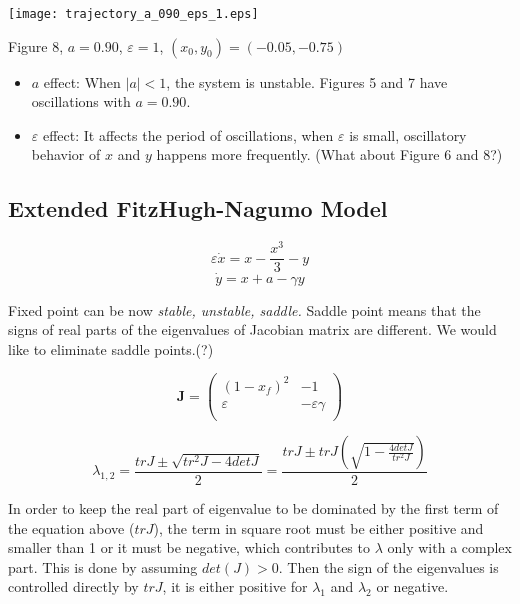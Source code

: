 \documentclass{article}
\begin{document}
\begin{center}
\texttt{[image: trajectory\_a\_090\_eps\_1.eps]}
\begin{footnotesize}
 Figure 8, $a=0.90$, $\varepsilon=1$, $(x_0,y_0)=(-0.05,-0.75)$
\end{footnotesize}
\end{center}
\begin{itemize}

 \item $a$ effect: When $|a|<1$, the system is unstable. Figures 5 and 7 have oscillations with $a=0.90$. 

 \item $\varepsilon$ effect: It affects the period of oscillations, when $\varepsilon$ is small, oscillatory behavior of $x$ and $y$ happens more frequently. (What about Figure 6 and 8?)
\end{itemize}

\subsection{Extended FitzHugh-Nagumo Model}

\begin{equation}
 \varepsilon \dot{x} = x- \frac{x^3}{3}-y 
\end{equation}
\begin{equation}
 \dot{y}=x+a -\gamma y
\end{equation}

Fixed point can be now \textit{stable, unstable, saddle.} \newline
Saddle point means that the signs of real parts of the eigenvalues of Jacobian matrix are different. We would like to eliminate saddle points.(?)

\[
\textbf{J}=
\left( {\begin{array}{cc }
(1-x_f)^2  &  -1  \\
\varepsilon &  -\varepsilon\gamma  \\

\end{array} } \right)
\]

\begin{equation*}
 \lambda_{1,2}=\frac{trJ\pm \sqrt{tr^2J-4 det J}}{2}=
\frac{trJ \pm trJ(\sqrt{1-\frac{4detJ}{tr^2J}})}{2}
\end{equation*}

In order to keep the real part of eigenvalue to be dominated by the first term of the equation above ($trJ$), the term in square root must be either positive and smaller than 1 or it must be negative, which contributes to $\lambda$ only with a complex part. This is done by assuming $det(J)>0$. Then the sign of the eigenvalues is controlled directly by $trJ$, it is either positive for $\lambda_1$ and $\lambda_2$ or negative.
\end{document}
